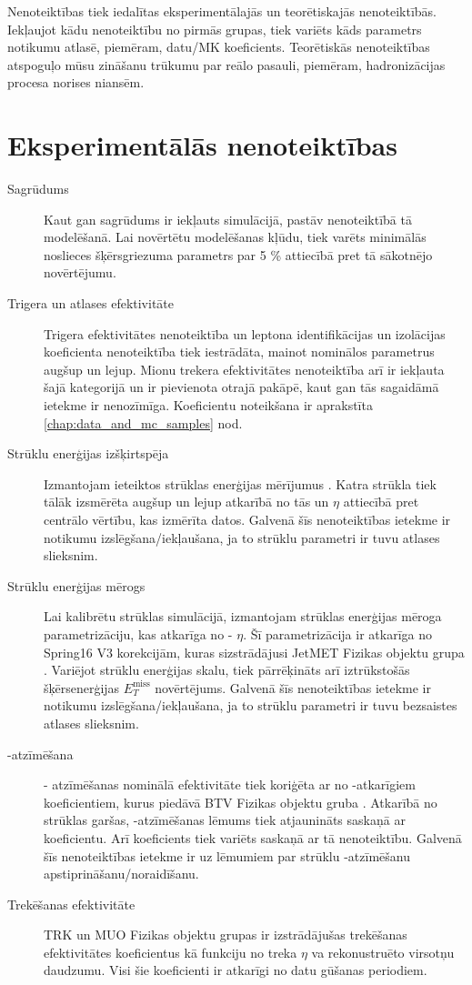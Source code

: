 Nenoteiktības tiek iedalītas eksperimentālajās un teorētiskajās nenoteiktībās. Iekļaujot kādu nenoteiktību no pirmās grupas, tiek variēts kāds parametrs notikumu atlasē, piemēram, datu/MK koeficients. Teorētiskās nenoteiktības atspoguļo mūsu zināšanu trūkumu par reālo pasauli, piemēram, hadronizācijas procesa norises niansēm. 

\section{Eksperimentālās nenoteiktības}
\begin{description}
\item[Sagrūdums] Kaut gan sagrūdums ir iekļauts simulācijā, pastāv nenoteiktībā tā modelēšanā. Lai novērtētu modelēšanas kļūdu, tiek varēts minimālās noslieces šķērsgriezuma parametrs par 5 \% attiecībā pret tā sākotnējo novērtējumu. 
\item[Trigera un atlases efektivitāte] Trigera efektivitātes nenoteiktība un leptona identifikācijas un izolācijas koeficienta nenoteiktība tiek iestrādāta, mainot nominālos parametrus augšup un lejup. Mionu trekera efektivitātes nenoteiktība arī ir iekļauta šajā kategorijā un ir pievienota otrajā pakāpē, kaut gan tās sagaidāmā ietekme ir nenozīmīga. Koeficientu noteikšana ir aprakstīta \ref{chap:data_and_mc_samples} nod.
\item[Strūklu enerģijas izšķirtspēja] Izmantojam ieteiktos strūklas enerģijas mērījumus \cite{twiki:JER}. Katra strūkla tiek tālāk izsmērēta augšup un lejup atkarībā no tās \pt un $\eta$ attiecībā pret centrālo vērtību, kas izmērīta datos. Galvenā šīs nenoteiktības ietekme ir notikumu izslēgšana/iekļaušana, ja to strūklu parametri ir tuvu atlases slieksnim. 
\item[Strūklu enerģijas mērogs] Lai kalibrētu strūklas simulācijā, izmantojam strūklas enerģijas mēroga parametrizāciju, kas atkarīga no \pt - $\eta$. Šī parametrizācija ir atkarīga no Spring16 V3 korekcijām, kuras sizstrādājusi JetMET Fizikas objektu grupa \cite{twiki:JER}.  Variējot strūklu enerģijas skalu, tiek pārrēķināts arī iztrūkstošās šķērsenerģijas $E^{\text{miss}}_{T}$ novērtējums. Galvenā šīs nenoteiktības ietekme ir notikumu izslēgšana/iekļaušana, ja to strūklu parametri ir tuvu bezsaistes atlases slieksnim. 
\item[\cPqb-atzīmēšana] \cPqb - atzīmēšanas nominālā efektivitāte tiek koriģēta ar no \pt-atkarīgiem koeficientiem, kurus piedāvā BTV Fizikas objektu gruba \cite{twiki:BTV}. Atkarībā no strūklas garšas, \cPqb-atzīmēšanas lēmums tiek atjaunināts saskaņā ar koeficientu. Arī koeficients tiek variēts saskaņā ar tā nenoteiktību. Galvenā šīs nenoteiktības ietekme ir uz lēmumiem par strūklu \cPqb-atzīmēšanu apstiprināšanu/noraidīšanu.
\item[Trekēšanas efektivitāte] TRK un MUO Fizikas objektu grupas ir izstrādājušas trekēšanas efektivitātes koeficientus kā funkciju no treka $\eta$ va rekonustruēto virsotņu daudzumu. Visi šie koeficienti ir atkarīgi no datu gūšanas periodiem.
\end{description}

